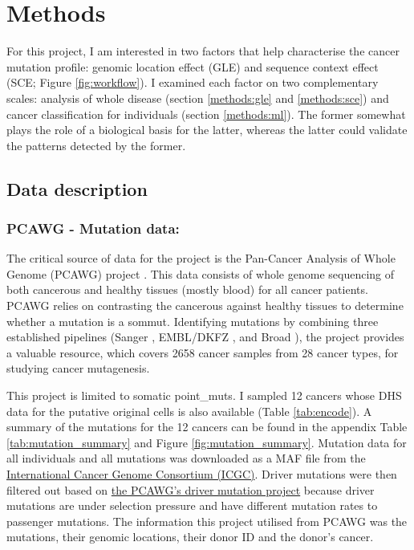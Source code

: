 \chapter{Methods}\label{methods}

For this project, I am interested in two factors that help characterise the cancer mutation profile: genomic location effect (GLE) and sequence context effect (SCE; Figure \ref{fig:workflow}). I examined each factor on two complementary scales: analysis of whole disease (section \ref{methods:gle} and \ref{methods:sce}) and cancer classification for individuals (section \ref{methods:ml}). The former somewhat plays the role of a biological basis for the latter, whereas the latter could validate the patterns detected by the former.



\section{Data description}
\subsection{PCAWG - Mutation data:} 
The critical source of data for the project is the Pan-Cancer Analysis of Whole Genome (PCAWG) project \citep{Campbell2020}. This data consists of whole genome sequencing of both cancerous and healthy tissues (mostly blood) for all cancer patients. PCAWG relies on contrasting the cancerous against healthy tissues to determine whether a mutation is a \gls{sommut}. Identifying mutations by combining three established pipelines (Sanger \citep{Jones2016CgpCaVEManWrapper:Data}, EMBL/DKFZ \citep{Rimmer2014IntegratingApplications}, and Broad \citep{Cibulskis2013SensitiveSamples}), the project provides a valuable resource, which covers 2658 cancer samples from 28 cancer types, for studying cancer mutagenesis.

This project is limited to somatic \glspl{point_mut}. I sampled 12 cancers whose DHS data for the putative original cells is also available (Table \ref{tab:encode}). A summary of the mutations for the 12 cancers can be found in the appendix Table \ref{tab:mutation_summary} and Figure \ref{fig:mutation_summary}. Mutation data for all individuals and all mutations was downloaded as a MAF file from the \href{https://dcc.icgc.org/releases/PCAWG/consensus_snv_indel}{International Cancer Genome Consortium (ICGC)}. Driver mutations were then filtered out based on \href{https://dcc.icgc.org/releases/PCAWG/driver_mutations}{the PCAWG's driver mutation project} because driver mutations are under selection pressure and have different mutation rates to passenger mutations. The information this project utilised from PCAWG was the mutations, their genomic locations, their donor ID and the donor's cancer. 

